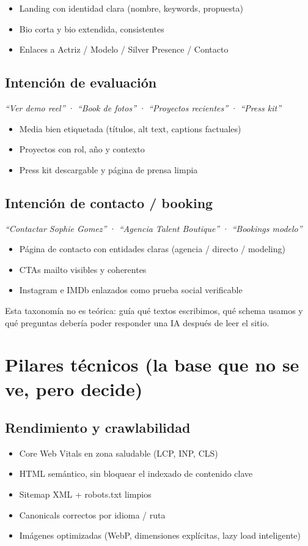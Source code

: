 \documentclass[11pt,a4paper]{article}
\begin{document}
\begin{itemize}
  \item Landing con identidad clara (nombre, keywords, propuesta)
  \item Bio corta y bio extendida, consistentes
  \item Enlaces a Actriz / Modelo / Silver Presence / Contacto
\end{itemize}

\subsection{Intención de evaluación}
\emph{``Ver demo reel''} · \emph{``Book de fotos''} · \emph{``Proyectos recientes''} · \emph{``Press kit''}

\begin{itemize}
  \item Media bien etiquetada (títulos, alt text, captions factuales)
  \item Proyectos con rol, año y contexto
  \item Press kit descargable y página de prensa limpia
\end{itemize}

\subsection{Intención de contacto / booking}
\emph{``Contactar Sophie Gomez''} · \emph{``Agencia Talent Boutique''} · \emph{``Bookings modelo''}

\begin{itemize}
  \item Página de contacto con entidades claras (agencia / directo / modeling)
  \item CTAs mailto visibles y coherentes
  \item Instagram e IMDb enlazados como prueba social verificable
\end{itemize}

Esta taxonomía no es teórica: guía qué textos escribimos, qué schema usamos
y qué preguntas debería poder responder una IA después de leer el sitio.

\section{Pilares técnicos (la base que no se ve, pero decide)}

\subsection{Rendimiento y crawlabilidad}
\begin{itemize}
  \item Core Web Vitals en zona saludable (LCP, INP, CLS)
  \item HTML semántico, sin bloquear el indexado de contenido clave
  \item Sitemap XML + robots.txt limpios
  \item Canonicals correctos por idioma / ruta
  \item Imágenes optimizadas (WebP, dimensiones explícitas, lazy load inteligente)
\end{itemize}
\end{document}
